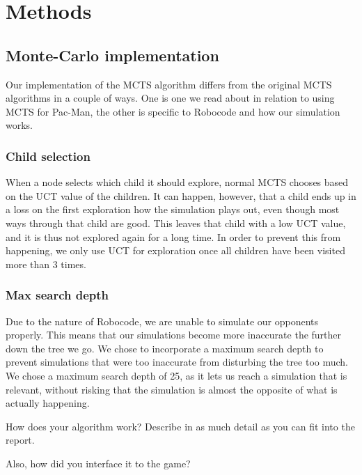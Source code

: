 \section{Methods}
\label{04}

\subsection{Monte-Carlo implementation}
\label{04_MCTS}

Our implementation of the MCTS algorithm differs from the original MCTS algorithms in a couple of ways. One is one we read about in relation to using MCTS for Pac-Man\cite{pepels2012enhancements}, the other is specific to Robocode and how our simulation works.

\subsubsection{Child selection}

When a node selects which child it should explore, normal MCTS chooses based on the UCT\cite{kocsis2006bandit} value of the children. It can happen, however, that a child ends up in a loss on the first exploration how the simulation plays out, even though most ways through that child are good. This leaves that child with a low UCT value, and it is thus not explored again for a long time. In order to prevent this from happening, we only use UCT for exploration once all children have been visited more than 3 times.

\subsubsection{Max search depth}

Due to the nature of Robocode, we are unable to simulate our opponents properly. This means that our simulations become more inaccurate the further down the tree we go. We chose to incorporate a maximum search depth to prevent simulations that were too inaccurate from disturbing the tree too much. We chose a maximum search depth of 25, as it lets us reach a simulation that is relevant, without risking that the simulation is almost the opposite of what is actually happening.





How does your algorithm work? Describe in as much detail as you can fit into the report. 

Also, how did you interface it to the game?
